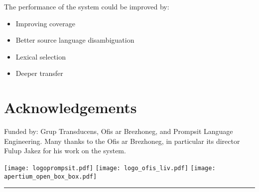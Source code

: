 \documentclass[a0,landscape]{a0poster}
\begin{document}
\begin{multicols}{4}
\noindent
The performance of the system could be improved by:

\begin{itemize}
  \item Improving coverage 
  \item Better source language disambiguation
  \item Lexical selection
  \item Deeper transfer
\end{itemize}

\section*{Acknowledgements}

\noindent
Funded by: Grup Transducens, Ofis ar Brezhoneg, and Prompsit Language Engineering.
Many thanks to the Ofis ar Brezhoneg, in particular its director Fulup Jakez for his
work on the system. 

\flushright
\begin{minipage}[b]{0.8\linewidth}
\texttt{[image: logoprompsit.pdf]}\hspace{0.8cm}
\texttt{[image: logo\_ofis\_liv.pdf]}\hspace{0.5cm}
\texttt{[image: apertium\_open\_box\_box.pdf]}
\end{minipage}

\vskip 0.1cm
\hrule
\vskip 0.1cm

\end{multicols}
\end{document}
